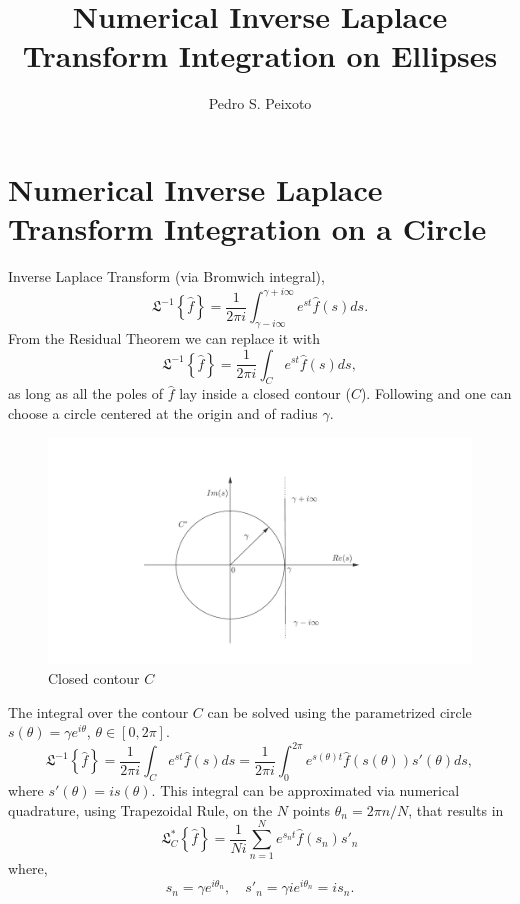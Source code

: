 \documentclass[10pt,a4paper,final]{article}
\title{Numerical Inverse Laplace Transform Integration on Ellipses}
\author{Pedro S. Peixoto}
\begin{document}
\maketitle

\section{Numerical Inverse Laplace Transform Integration on a Circle}


Inverse Laplace Transform (via Bromwich integral),
\begin{equation}
{ \mathfrak{ L } }^{ -1 }\left\{ \widehat { f }  \right\} =\frac { 1 }{ 2\pi i } \int _{ \gamma -i\infty  }^{ \gamma +i\infty  }{ { e }^{ st }\widehat { f } \left( s \right) ds } .
\end{equation}
From the Residual Theorem we can replace it with 
\begin{equation}
{ \mathfrak{ L } }^{ -1 }\left\{ \widehat { f }  \right\}=\frac{1}{2\pi i}\int _{ { C }^{  } }{ { e }^{ st }\widehat { f } \left( s \right) ds },
\end{equation}
as long as all the poles of $\widehat{f}$ lay inside a closed contour ($C$). Following \citet{cclancy11} and \citet{clancy:PhD} one can choose a circle centered at the origin and of radius $\gamma$.
\begin{figure}[!h]
  \centering
  \hspace{1cm}
  \includegraphics[width=.5\textwidth]{Cstar} 
  \caption[Closed contour $C $]{Closed contour $C$}
  \label{fig:Cstar} 
\end{figure}

The integral over the contour $C $ can be solved using the parametrized circle $s(\theta)=\gamma e^{i\theta}$, $\theta \in [0,2\pi]$.
\begin{equation}
{ \mathfrak{ L } }^{ -1 }\left\{ \widehat { f }  \right\}=\frac{1}{2\pi i}\int _{ { C }^{  } }{ { e }^{ st }\widehat { f } \left( s \right) ds }=\frac{1}{2\pi i}\int _{0}^{2\pi}{ { e }^{ s(\theta)t }\widehat { f } \left( s(\theta) \right)s'(\theta) ds },
\end{equation}
where $s'(\theta)=is(\theta)$. This integral can be approximated via numerical quadrature, using Trapezoidal Rule, on the $N$  points $\theta_n=2\pi n/N$, that results in 
\begin{equation}
{ \mathfrak{ L } }^{ * }_C\left\{ \widehat { f }  \right\}=\frac { 1 }{ Ni} \sum _{ n=1 }^{ N }{ { e }^{ { s }_{ n }t }\widehat { f } \left( { s }_{ n } \right) { s }'_{ n } }
\end{equation}
where,
\begin{equation}
s_{n}=\gamma e^{{i\theta_n}}, \quad s'_{n}=\gamma i e^{{i\theta_n}}=is_n.
\end{equation}
\end{document}

